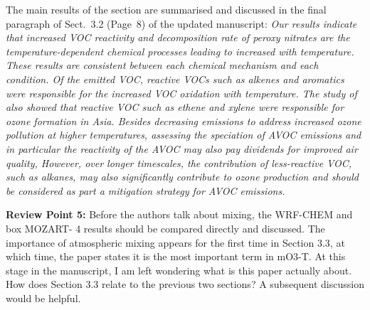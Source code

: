 \documentclass{article}
\begin{document}
The main results of the section are summarised and discussed in the final paragraph of Sect.~3.2 (Page~8) of the updated manuscript:
\textit{
Our results indicate that increased VOC reactivity and decomposition rate of peroxy nitrates are the temperature-dependent chemical processes leading to increased  with temperature.
These results are consistent between each chemical mechanism and each  condition.
Of the emitted VOC, reactive VOCs such as alkenes and aromatics were responsible for the increased VOC oxidation with temperature.
The study of \citet{Li:2014} also showed that reactive VOC such as ethene and xylene were responsible for ozone formation in Asia.
Besides decreasing  emissions to address increased ozone pollution at higher temperatures, assessing the speciation of AVOC emissions and in particular the reactivity of the AVOC may also pay dividends for improved air quality,
However, over longer timescales, the contribution of less-reactive VOC, such as alkanes, may also significantly contribute to ozone production \citep{Butler:2011, vonSchneidemesser:2016} and should be considered as part a mitigation strategy for AVOC emissions.
}

\textbf{Review Point 5:} Before the authors talk about mixing, the WRF-CHEM and box MOZART- 4 results should be compared directly and discussed. The importance of atmospheric mixing appears for the first time in Section 3.3, at which time, the paper states it is the most important term in mO3-T. At this stage in the manuscript, I am left wondering what is this paper actually about. How does Section 3.3 relate to the previous two sections?  A subsequent discussion would be helpful.
\end{document}

